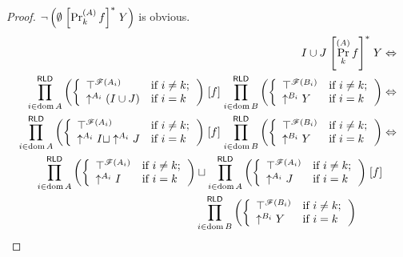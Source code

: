 \begin{proof}
$\neg\left(\emptyset\mathrel{\left[\Pr_{k}^{(A)}f\right]^{\ast}}Y\right)$ is obvious.
\begin{align*}
I\cup J\rsuprel{\Pr_{k}^{(A)}f}Y & \Leftrightarrow\\
\prod_{i\in\dom A}^{\mathsf{RLD}}\left(\left\{ \begin{array}{ll}
\top^{\mathscr{F}(A_{i})} & \text{if }i\neq k;\\
\uparrow^{A_{i}}(I\cup J) & \text{if }i=k
\end{array}\right.\right)\suprel f\prod_{i\in\dom B}^{\mathsf{RLD}}\left(\left\{ \begin{array}{ll}
\top^{\mathscr{F}(B_{i})} & \text{if }i\neq k;\\
\uparrow^{B_{i}}Y & \text{if }i=k
\end{array}\right.\right) & \Leftrightarrow\\
\prod_{i\in\dom A}^{\mathsf{RLD}}\left(\left\{ \begin{array}{ll}
\top^{\mathscr{F}(A_{i})} & \text{if }i\neq k;\\
\uparrow^{A_{i}}I\sqcup\uparrow^{A_{i}}J & \text{if }i=k
\end{array}\right.\right)\suprel f\prod_{i\in\dom B}^{\mathsf{RLD}}\left(\left\{ \begin{array}{ll}
\top^{\mathscr{F}(B_{i})} & \text{if }i\neq k;\\
\uparrow^{B_{i}}Y & \text{if }i=k
\end{array}\right.\right) & \Leftrightarrow\\
\begin{aligned}\prod_{i\in\dom A}^{\mathsf{RLD}}\left(\left\{ \begin{array}{ll}
\top^{\mathscr{F}(A_{i})} & \text{if }i\neq k;\\
\uparrow^{A_{i}}I & \text{if }i=k
\end{array}\right.\right) & \sqcup\prod_{i\in\dom A}^{\mathsf{RLD}}\left(\left\{ \begin{array}{ll}
\top^{\mathscr{F}(A_{i})} & \text{if }i\neq k;\\
\uparrow^{A_{i}}J & \text{if }i=k
\end{array}\right.\right)\suprel f\\
 & \prod_{i\in\dom B}^{\mathsf{RLD}}\left(\left\{ \begin{array}{ll}
\top^{\mathscr{F}(B_{i})} & \text{if }i\neq k;\\
\uparrow^{B_{i}}Y & \text{if }i=k
\end{array}\right.\right)

\end{aligned}
\end{align*}
\end{proof}
